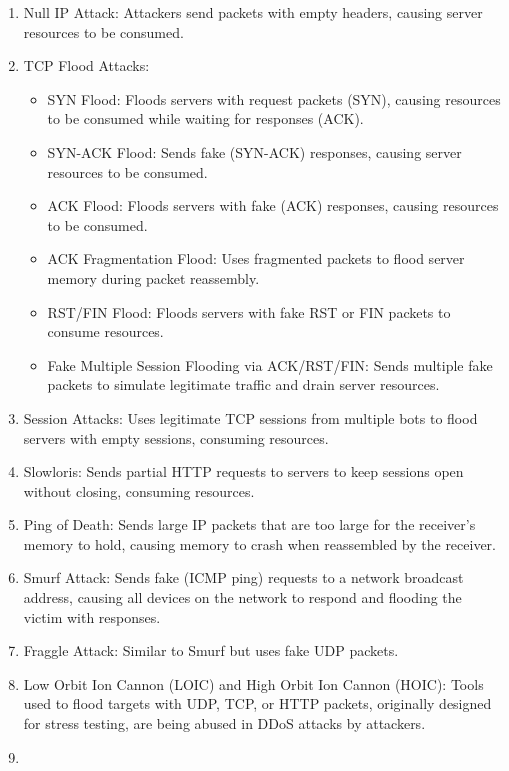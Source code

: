 \documentclass[a4paper, 12pt]{report} %
\begin{document}
        \begin{enumerate}
        \item Null IP Attack: Attackers send packets with empty headers, causing server resources to be consumed.
        \item TCP Flood Attacks:
        \begin{itemize}
            \item SYN Flood: Floods servers with request packets (SYN), causing resources to be consumed while waiting for responses (ACK).
            \item SYN-ACK Flood: Sends fake (SYN-ACK) responses, causing server resources to be consumed.
            \item ACK Flood: Floods servers with fake (ACK) responses, causing resources to be consumed.
            \item ACK Fragmentation Flood: Uses fragmented packets to flood server memory during packet reassembly.
            \item RST/FIN Flood: Floods servers with fake RST or FIN packets to consume resources.
            \item Fake Multiple Session Flooding via ACK/RST/FIN: Sends multiple fake packets to simulate legitimate traffic and drain server resources.
            
            
        \end{itemize}
        \item Session Attacks: Uses legitimate TCP sessions from multiple bots to flood servers with empty sessions, consuming resources.
        \item Slowloris: Sends partial HTTP requests to servers to keep sessions open without closing, consuming resources.
        \item Ping of Death: Sends large IP packets that are too large for the receiver’s memory to hold, causing memory to crash when reassembled by the receiver.
        \item Smurf Attack: Sends fake (ICMP ping) requests to a network broadcast address, causing all devices on the network to respond and flooding the victim with responses.
        \item Fraggle Attack: Similar to Smurf but uses fake UDP packets.
        \item Low Orbit Ion Cannon (LOIC) and High Orbit Ion Cannon (HOIC): Tools used to flood targets with UDP, TCP, or HTTP packets, originally designed for stress testing, are being abused in DDoS attacks by attackers.
        \item 
        \end{enumerate}
\end{document}
